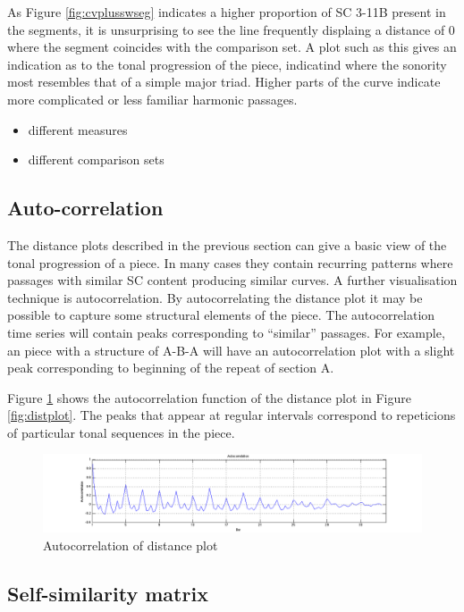 \documentclass{article}
\begin{document}
As Figure \ref{fig:cvplusswseg} indicates a higher proportion of SC
3-11B present in the segments, it is unsurprising to see the line
frequently displaing a distance of 0 where the segment coincides with
the comparison set. A plot such as this gives an indication as to the
tonal progression of the piece, indicatind where the sonority most
resembles that of a simple major triad. Higher parts of the curve
indicate more complicated or less familiar harmonic passages.

\begin{itemize}
\item different measures
\item different comparison sets
\end{itemize}
\subsection{Auto-correlation}
\label{sec-9-2}

The distance plots described in the previous section can give a basic
view of the tonal progression of a piece. In many cases they contain
recurring patterns where passages with similar SC content producing
similar curves. A further visualisation technique is
autocorrelation. By autocorrelating the distance plot it may be
possible to capture some structural elements of the piece. The
autocorrelation time series will contain peaks corresponding to
``similar'' passages. For example, an piece with a structure of A-B-A
will have an autocorrelation plot with a slight peak corresponding to
beginning of the repeat of section A.

Figure \ref{fig:autocorr} shows the autocorrelation function of the
distance plot in Figure \ref{fig:distplot}. The peaks that appear at
regular intervals correspond to repeticions of particular tonal
sequences in the piece.

\begin{figure}[htb]
\centering
\includegraphics[width=.9\linewidth]{../plots/autocorr.png}
\caption{\label{fig:autocorr}Autocorrelation of distance plot}
\end{figure}
\subsection{Self-similarity matrix}
\label{sec-9-3}
\end{document}
